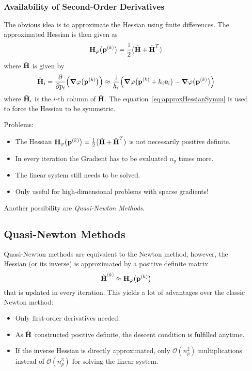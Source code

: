 			\subsubsection{Availability of Second-Order Derivatives}
				The obvious idea is to approximate the Hessian using finite differences. The approximated Hessian is then given as
				\begin{align*}
					\boldsymbol{\mathrm{H}}_\varphi\big(\boldsymbol{\mathrm{p}}^{(k)}\big) = \frac{1}{2} \big( \tilde{\boldsymbol{\mathrm{H}}} + \tilde{\boldsymbol{\mathrm{H}}}^T )  \label{eq:approxHessianSymm}
				\end{align*}
				where \(\tilde{\boldsymbol{\mathrm{H}}}\) is given by
				\begin{align*}
					\tilde{\boldsymbol{\mathrm{H}}}_i = \pdv{p_i} \Big( \grad{\varphi}\big(\boldsymbol{\mathrm{p}}^{(k)}\big) \Big) \approx \frac{1}{h_i} \Big( \grad{\varphi}\big(\boldsymbol{\mathrm{p}}^{(k)} + h_i \boldsymbol{\mathrm{e}}_i\big) - \grad{\varphi}\big(\boldsymbol{\mathrm{p}}^{(k)}\big) \Big)
				\end{align*}
				where \( \tilde{\boldsymbol{\mathrm{H}}}_i \) is the \(i\)-th column of \(\tilde{\boldsymbol{\mathrm{H}}}\). The equation~\eqref{eq:approxHessianSymm} is used to force the Hessian to be symmetric.
				
				Problems:
				\begin{itemize}
					\item The Hessian \( \boldsymbol{\mathrm{H}}_\varphi\big(\boldsymbol{\mathrm{p}}^{(k)}\big) = \frac{1}{2} \big( \tilde{\boldsymbol{\mathrm{H}}} + \tilde{\boldsymbol{\mathrm{H}}}^T ) \) is not necessarily positive definite.
					\item In every iteration the Gradient has to be evaluated \(n_p\) times more.
					\item The linear system still needs to be solved.
					\item Only useful for high-dimensional problems with sparse gradients!
				\end{itemize}
				Another possibility are \emph{Quasi-Newton Methods}.

		\subsection{Quasi-Newton Methods}
			Quasi-Newton methods are equivalent to the Newton method, however, the Hessian (or its inverse) is approximated by a positive definite matrix
			\begin{align*}
				\hat{\boldsymbol{\mathrm{H}}}^{(k)} \approx \boldsymbol{\mathrm{H}}_\varphi\big(\boldsymbol{\mathrm{p}}^{(k)}\big)
			\end{align*}
			that is updated in every iteration. This yields a lot of advantages over the classic Newton method:
			\begin{itemize}
				\item Only first-order derivatives needed.
				\item As \( \hat{\boldsymbol{\mathrm{H}}} \) constructed positive definite, the descent condition is fulfilled anytime.
				\item If the inverse Hessian is directly approximated, only \( \mathcal{O}(n_p^2) \) multiplications instead of \( \mathcal{O}(n_p^3) \) for solving the linear system.
			\end{itemize}
		
